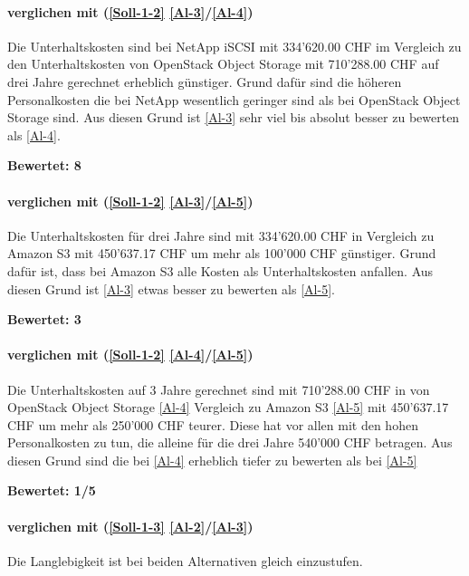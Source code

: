 \paragraph*{  verglichen mit  (\ref{Soll-1-2} \ref{Al-3}/\ref{Al-4})}
Die Unterhaltskosten sind bei NetApp iSCSI mit 334'620.00 CHF im Vergleich zu den Unterhaltskosten von OpenStack Object Storage mit 710'288.00 CHF auf drei Jahre gerechnet erheblich günstiger. Grund dafür sind die höheren Personalkosten die bei NetApp wesentlich geringer sind als bei OpenStack Object Storage sind. Aus diesen Grund ist  \ref{Al-3} sehr viel bis absolut besser zu bewerten als  \ref{Al-4}.

\textbf{Bewertet: 8}

\paragraph*{  verglichen mit  (\ref{Soll-1-2} \ref{Al-3}/\ref{Al-5})}
Die Unterhaltskosten für drei Jahre sind mit 334'620.00 CHF in Vergleich zu Amazon S3 mit 450'637.17 CHF um mehr als 100'000 CHF günstiger. Grund dafür ist, dass bei Amazon S3 alle Kosten als Unterhaltskosten anfallen.
Aus diesen Grund ist  \ref{Al-3} etwas besser zu bewerten als  \ref{Al-5}.

\textbf{Bewertet: 3}


\paragraph*{  verglichen mit  (\ref{Soll-1-2} \ref{Al-4}/\ref{Al-5})}
Die Unterhaltskosten auf 3 Jahre gerechnet sind mit 710'288.00 CHF in von OpenStack Object Storage \ref{Al-4} Vergleich zu Amazon S3 \ref{Al-5} mit 450'637.17 CHF um mehr als 250'000 CHF teurer. Diese hat vor allen mit den hohen Personalkosten zu tun, die alleine für die drei Jahre 540'000 CHF betragen. Aus diesen Grund sind die  bei \ref{Al-4} erheblich tiefer zu bewerten als bei \ref{Al-5}

\textbf{Bewertet: 1/5}


\paragraph*{  verglichen mit  (\ref{Soll-1-3} \ref{Al-2}/\ref{Al-3})}
Die Langlebigkeit ist bei beiden Alternativen gleich einzustufen.

